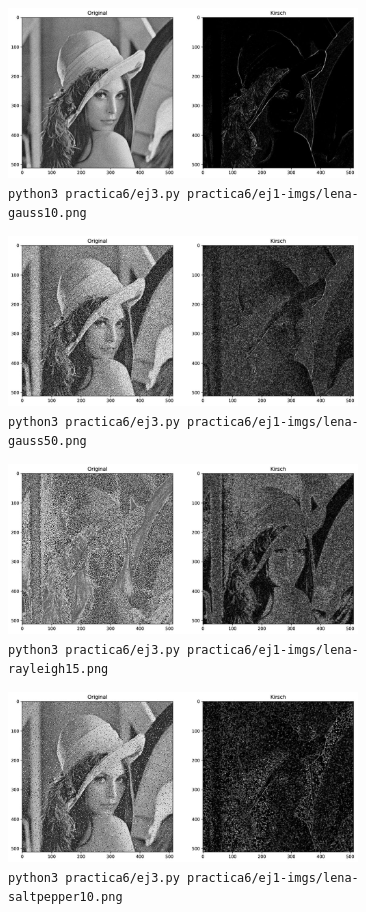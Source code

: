 \documentclass[11pt, spanish]{article}
\begin{document}
\begin{figure}[H]
\centering
    \includegraphics[height=4.5cm]{informe-imgs/ej3--lena-gauss10.jpg}
    \caption{\texttt{python3 practica6/ej3.py practica6/ej1-imgs/lena-gauss10.png }}
\end{figure}

\begin{figure}[H]
\centering
    \includegraphics[height=4.5cm]{informe-imgs/ej3--lena-gauss50.jpg}
    \caption{\texttt{python3 practica6/ej3.py practica6/ej1-imgs/lena-gauss50.png }}
\end{figure}

\begin{figure}[H]
\centering
    \includegraphics[height=4.5cm]{informe-imgs/ej3--lena-rayleigh15.jpg}
    \caption{\texttt{python3 practica6/ej3.py practica6/ej1-imgs/lena-rayleigh15.png }}
\end{figure}

\begin{figure}[H]
\centering
    \includegraphics[height=4.5cm]{informe-imgs/ej3--lena-saltpepper10.jpg}
    \caption{\texttt{python3 practica6/ej3.py practica6/ej1-imgs/lena-saltpepper10.png }}
\end{figure}
\end{document}
